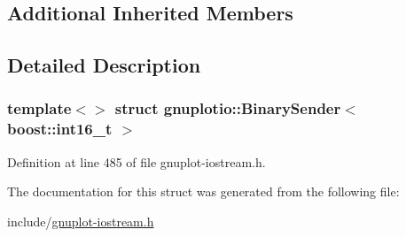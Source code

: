\subsection*{Additional Inherited Members}


\subsection{Detailed Description}
\subsubsection*{template$<$$>$\newline
struct gnuplotio\+::\+Binary\+Sender$<$ boost\+::int16\+\_\+t $>$}



Definition at line 485 of file gnuplot-\/iostream.\+h.



The documentation for this struct was generated from the following file\+:\begin{DoxyCompactItemize}
\item 
include/\hyperlink{gnuplot-iostream_8h}{gnuplot-\/iostream.\+h}\end{DoxyCompactItemize}
